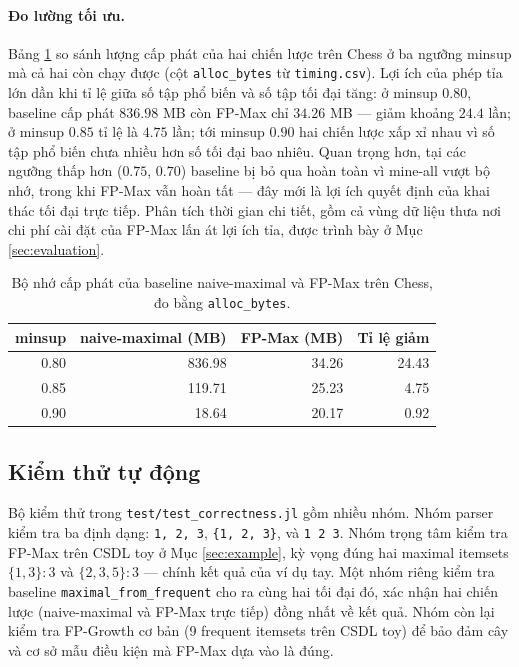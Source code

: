 \paragraph{Đo lường tối ưu.} Bảng \ref{tab:perf-alloc} so sánh lượng cấp phát của hai chiến lược trên Chess ở ba ngưỡng minsup mà cả hai còn chạy được (cột \texttt{alloc\_bytes} từ \texttt{timing.csv}). Lợi ích của phép tỉa lớn dần khi tỉ lệ giữa số tập phổ biến và số tập tối đại tăng: ở minsup $0.80$, baseline cấp phát $836.98$ MB còn FP-Max chỉ $34.26$ MB --- giảm khoảng $24.4$ lần; ở minsup $0.85$ tỉ lệ là $4.75$ lần; tới minsup $0.90$ hai chiến lược xấp xỉ nhau vì số tập phổ biến chưa nhiều hơn số tối đại bao nhiêu. Quan trọng hơn, tại các ngưỡng thấp hơn ($0.75$, $0.70$) baseline bị bỏ qua hoàn toàn vì mine-all vượt bộ nhớ, trong khi FP-Max vẫn hoàn tất --- đây mới là lợi ích quyết định của khai thác tối đại trực tiếp. Phân tích thời gian chi tiết, gồm cả vùng dữ liệu thưa nơi chi phí cài đặt của FP-Max lấn át lợi ích tỉa, được trình bày ở Mục \ref{sec:evaluation}.

\begin{table}[H]
    \centering
    \caption{Bộ nhớ cấp phát của baseline naive-maximal và FP-Max trên Chess, đo bằng \texttt{alloc\_bytes}.}
    \label{tab:perf-alloc}
    \begin{tabular}{r r r r}
        \toprule
        minsup & naive-maximal (MB) & FP-Max (MB) & Tỉ lệ giảm \\
        \midrule
        0.80 & 836.98 & 34.26 & 24.43 \\
        0.85 & 119.71 & 25.23 & 4.75 \\
        0.90 & 18.64 & 20.17 & 0.92 \\
        \bottomrule
    \end{tabular}
\end{table}

\subsection{Kiểm thử tự động}

Bộ kiểm thử trong \texttt{test/test\_correctness.jl} gồm nhiều nhóm. Nhóm parser kiểm tra ba định dạng: \texttt{1, 2, 3}, \texttt{\{1, 2, 3\}}, và \texttt{1 2 3}. Nhóm trọng tâm kiểm tra FP-Max trên CSDL toy ở Mục \ref{sec:example}, kỳ vọng đúng hai maximal itemsets $\{1,3\}:3$ và $\{2,3,5\}:3$ --- chính kết quả của ví dụ tay. Một nhóm riêng kiểm tra baseline \texttt{maximal\_from\_frequent} cho ra cùng hai tối đại đó, xác nhận hai chiến lược (naive-maximal và FP-Max trực tiếp) đồng nhất về kết quả. Nhóm còn lại kiểm tra FP-Growth cơ bản (9 frequent itemsets trên CSDL toy) để bảo đảm cây và cơ sở mẫu điều kiện mà FP-Max dựa vào là đúng.

